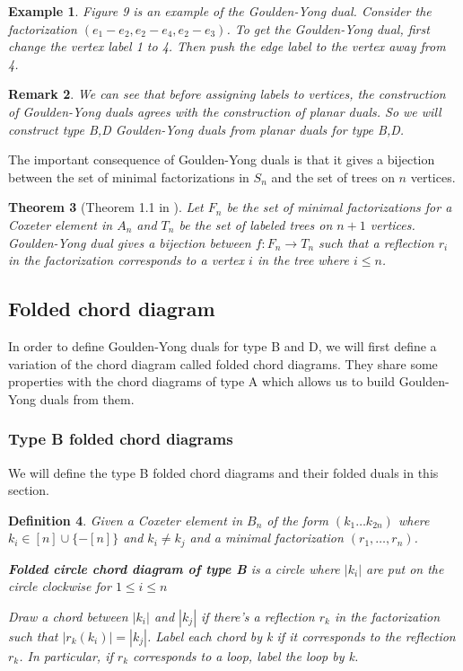 \documentclass[11pt]{amsart}
\newtheorem{thm}{Theorem}[section]
\newtheorem{defi}[thm]{Definition}%
\newtheorem{exa}[thm]{Example}%
\newtheorem{rema}[thm]{Remark}%
\begin{document}
\begin{exa}
    Figure 9 is an example of the Goulden-Yong dual. Consider the factorization $(e_1-e_2,e_2-e_4,e_2-e_3)$. To get the Goulden-Yong dual, first change the vertex label 1 to 4. Then push the edge label to the vertex away from 4.
\end{exa}

\begin{rema}
    We can see that before assigning labels to vertices, the construction of Goulden-Yong duals agrees with the construction of planar duals. So we will construct type B,D Goulden-Yong duals from planar duals for type B,D.
\end{rema}

The important consequence of Goulden-Yong duals is that it gives a bijection between the set of minimal factorizations in $S_n$ and the set of trees on $n$ vertices.

\begin{thm}[Theorem 1.1 in \cite{MR1897927}]
    Let $F_n$ be the set of minimal factorizations for a Coxeter element in $A_n$ and $T_n$ be the set of labeled trees on $n+1$ vertices. Goulden-Yong dual gives a bijection between $f: F_n \rightarrow T_n$ such that a reflection $r_i$ in the factorization corresponds to a vertex $i$ in the tree where $i\le n$.
\end{thm}

\subsection{Folded chord diagram}
In order to define Goulden-Yong duals for type B and D, we will first define a variation of the chord diagram called folded chord diagrams. They share some properties with the chord diagrams of type A which allows us to build Goulden-Yong duals from them.

\subsubsection{Type B folded chord diagrams}

We will define the type B folded chord diagrams and their folded duals in this section.

\begin{defi}
Given a Coxeter element in $B_n$ of the form $(k_1 \dots k_{2n})$ where $k_i \in [n] \cup \{-[n]\}$ and $k_i \neq k_j$ and a minimal factorization $(r_1,\dots,r_n)$. 

\textbf{Folded circle chord diagram of type B} is a circle where $|k_i|$ are put on the circle clockwise for $1 \leq i \leq n$ 

Draw a chord between $|k_i|$ and $|k_j|$ if there's a reflection $r_k$ in the factorization such that $|r_k(k_i)|=|k_j|$. Label each chord by k if it corresponds to the reflection $r_k$. In particular, if $r_k$ corresponds to a loop, label the loop by k.
\end{defi}
\end{document}
